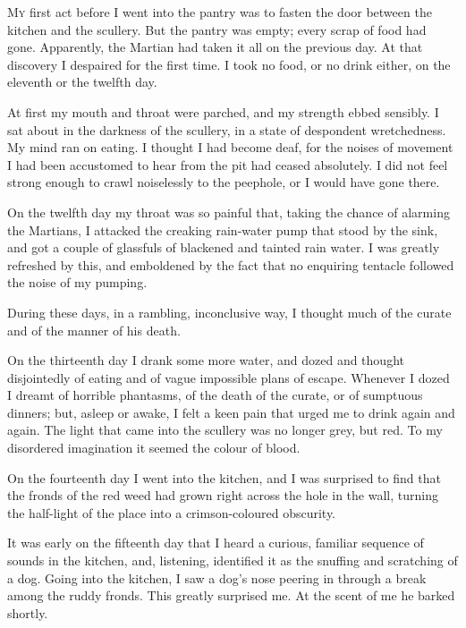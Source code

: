 

\lettrine[lines=4,findent=2pt]{M}{y} first act before I went into the pantry was to fasten the door between the kitchen and the scullery. But the pantry was empty; every scrap of food had gone. Apparently, the Martian had taken it all on the previous day. At that discovery I despaired for the first time. I took no food, or no drink either, on the eleventh or the twelfth day.

At first my mouth and throat were parched, and my strength ebbed sensibly. I sat about in the darkness of the scullery, in a state of despondent wretchedness. My mind ran on eating. I thought I had become deaf, for the noises of movement I had been accustomed to hear from the pit had ceased absolutely. I did not feel strong enough to crawl noiselessly to the peephole, or I would have gone there.

On the twelfth day my throat was so painful that, taking the chance of alarming the Martians, I attacked the creaking rain-water pump that stood by the sink, and got a couple of glassfuls of blackened and tainted rain water. I was greatly refreshed by this, and emboldened by the fact that no enquiring tentacle followed the noise of my pumping.

During these days, in a rambling, inconclusive way, I thought much of the curate and of the manner of his death.

On the thirteenth day I drank some more water, and dozed and thought disjointedly of eating and of vague impossible plans of escape. Whenever I dozed I dreamt of horrible phantasms, of the death of the curate, or of sumptuous dinners; but, asleep or awake, I felt a keen pain that urged me to drink again and again. The light that came into the scullery was no longer grey, but red. To my disordered imagination it seemed the colour of blood.

On the fourteenth day I went into the kitchen, and I was surprised to find that the fronds of the red weed had grown right across the hole in the wall, turning the half-light of the place into a crimson-coloured obscurity.

It was early on the fifteenth day that I heard a curious, familiar sequence of sounds in the kitchen, and, listening, identified it as the snuffing and scratching of a dog. Going into the kitchen, I saw a dog's nose peering in through a break among the ruddy fronds. This greatly surprised me. At the scent of me he barked shortly.

